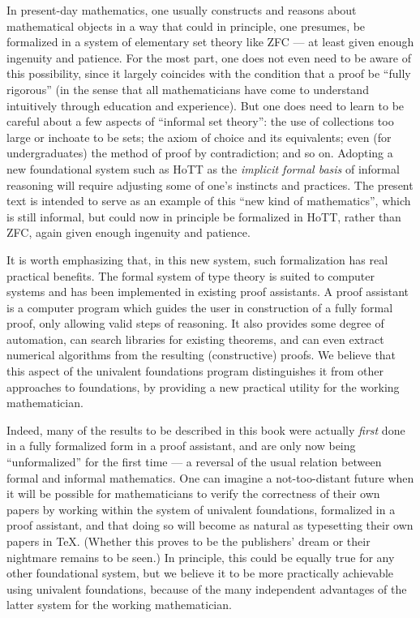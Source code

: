In present-day mathematics, one usually constructs and reasons about mathematical objects in a way that could in principle, one presumes, be formalized in a system of elementary set theory like ZFC --- at least given enough ingenuity and patience.
For the most part, one does not even need to be aware of this possibility, since it largely coincides with the condition that a proof be ``fully rigorous'' (in the sense that all mathematicians have come to understand intuitively through education and experience).
But one does need to learn to be careful about a few aspects of ``informal set theory'': the use of collections too large or inchoate to be sets; the axiom of choice and its equivalents; even (for undergraduates) the method of proof by contradiction; and so on.
Adopting a new foundational system such as HoTT as the \emph{implicit formal basis} of informal reasoning will require adjusting some of one's instincts and practices.
The present text is intended to serve as an example of this ``new kind of mathematics'', which is still informal, but could now in principle be formalized in HoTT, rather than ZFC, again given enough ingenuity and patience.

It is worth emphasizing that, in this new system, such formalization has real practical benefits.
The formal system of type theory is suited to computer systems and has been implemented in existing proof assistants.
A proof assistant is a computer program which guides the user in construction of a fully formal proof, only allowing valid steps of reasoning.
It also provides some degree of automation, can search libraries for existing theorems, and can even extract numerical algorithms from the resulting (constructive) proofs.
We believe that this aspect of the univalent foundations program distinguishes it from other approaches to foundations, by providing a new practical utility for the working mathematician.

Indeed, many of the results to be described in this book were actually \emph{first} done in a fully formalized form in a proof assistant, and are only now being ``unformalized'' for the first time --- a reversal of the usual relation between formal and informal mathematics.
One can imagine a not-too-distant future when it will be possible for mathematicians to verify the correctness of their own papers by working within the system of univalent foundations, formalized in a proof assistant, and that doing so will become as natural as typesetting their own papers in \TeX.
(Whether this proves to be the publishers' dream or their nightmare remains to be seen.) 
In principle, this could be equally true for any other foundational system, but we believe it to be more practically achievable using univalent foundations, because of the many independent advantages of the latter system for the working mathematician.

